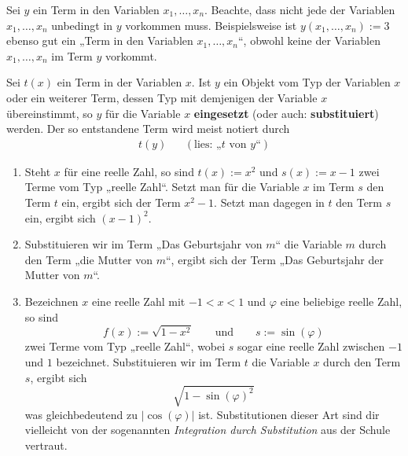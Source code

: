 \begin{bem}
    Sei $y$ ein Term in den Variablen $x_1,\dots , x_n$. Beachte, dass nicht jede der Variablen $x_1,\dots , x_n$ unbedingt in $y$ vorkommen muss. Beispielsweise ist $y(x_1,\dots , x_n):=3$ ebenso gut ein „Term in den Variablen $x_1,\dots , x_n$“, obwohl keine der Variablen $x_1,\dots , x_n$ im Term $y$ vorkommt.
\end{bem}


\begin{de}[* Variablensubstitution] \label{def:substitution}
    Sei $t(x)$ ein Term in der Variablen $x$. Ist $y$ ein Objekt vom Typ der Variablen $x$ oder ein weiterer Term, dessen Typ mit demjenigen der Variable $x$ übereinstimmt, so $y$ für die Variable $x$ \textbf{eingesetzt} (oder auch: \textbf{substituiert}) werden. Der so entstandene Term wird meist notiert durch
    \begin{align*}
        t(y) && (\text{lies: „$t$ von $y$“})
    \end{align*}
\end{de}


\begin{bsp}[*] \quad \label{bsp:substitution}
    \begin{enumerate}
        \item Steht $x$ für eine reelle Zahl, so sind $t(x):=x^2$ und $s(x):=x-1$ zwei Terme vom Typ „reelle Zahl“. Setzt man für die Variable $x$ im Term $s$ den Term $t$ ein, ergibt sich der Term $x^2-1$. Setzt man dagegen in $t$ den Term $s$ ein, ergibt sich $(x-1)^2$.
        \item Substituieren wir im Term „Das Geburtsjahr von $m$“ die Variable $m$ durch den Term „die Mutter von $m$“, ergibt sich der Term „Das Geburtsjahr der Mutter von $m$“.
        \item Bezeichnen $x$ eine reelle Zahl mit $-1<x<1$ und $\varphi$ eine beliebige reelle Zahl, so sind
            \[ f(x):=\sqrt{1-x^2} \qquad\text{und}\qquad s:=\sin(\varphi) \]
        zwei Terme vom Typ „reelle Zahl“, wobei $s$ sogar eine reelle Zahl zwischen $-1$ und $1$ bezeichnet. Substituieren wir im Term $t$ die Variable $x$ durch den Term $s$, ergibt sich
            \[ \sqrt{1-\sin(\varphi)^2} \]
        was gleichbedeutend zu $\vert \cos(\varphi)\vert$ ist. Substitutionen dieser Art sind dir vielleicht von der sogenannten \emph{Integration durch Substitution} aus der Schule vertraut.
    \end{enumerate}
\end{bsp}





